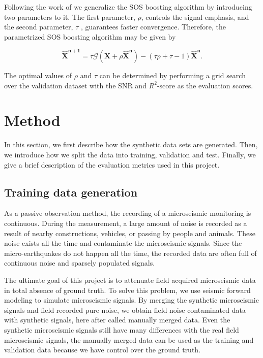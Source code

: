 \documentclass[a4paper]{article}
\begin{document}
Following the work of \cite{RomanoE15} we generalize the SOS boosting algorithm by introducing two parameters to it. The first parameter, $\rho$, controls the signal emphasis, and the second parameter, $\tau$ , guarantees faster convergence. Therefore, the parametrized SOS boosting algorithm may be given by

\begin{equation}
\mathbf{\hat{X}^{n+1}} = \tau\mathcal{G}(\mathbf{X}+\rho\mathbf{\hat{X}^n}) - (\tau\rho + \tau -1) \mathbf{\hat{X}^n} .
\label{eqn3}
\end{equation}

The optimal values of $\rho$ and $\tau$ can be determined by performing a grid search over the validation dataset with the SNR and $R^2$-score as the evaluation scores. 

\section{Method}

In this section, we first describe how the synthetic data sets are generated. Then, we introduce how we split the data into training, validation and test. Finally, we give a brief description of the evaluation metrics used in this project.

\subsection{Training data generation} 

As a passive observation method, the recording of a microseismic monitoring is continuous. During the measurement, a large amount of noise is recorded as a result of nearby constructions, vehicles, or passing by people and animals. These noise exists all the time and contaminate the microseismic signals. Since the micro-earthquakes do not happen all the time, the recorded data are often full of continuous noise and sparsely populated signals.

The ultimate goal of this project is to attenuate field acquired microseismic data in total absence of ground truth. To solve this problem, we use seismic forward modeling to simulate microseismic signals. By merging the synthetic microseismic signals and field recorded pure noise, we obtain field noise contaminated data with synthetic signals, here after called manually merged data. Even the synthetic microseismic signals still have many differences with the real field microseismic signals, the manually merged data can be used as the training and validation data because we have control over the ground truth. 
\end{document}
